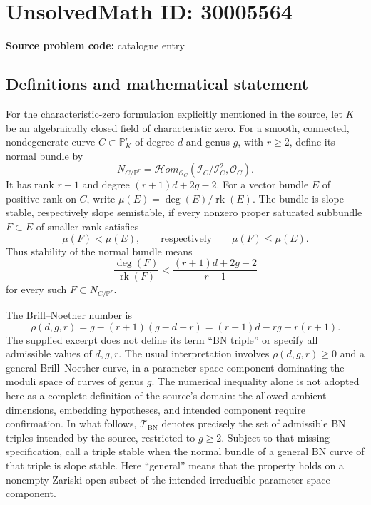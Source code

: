 \documentclass[11pt]{article}
\newcommand{\PP}{\mathbb{P}}
\begin{document}
\section*{UnsolvedMath ID: 30005564}
\textbf{Source problem code:} catalogue entry
\subsection{Definitions and mathematical statement}
For the characteristic-zero formulation explicitly mentioned in the source, let \(K\) be an algebraically closed field of characteristic zero. For a smooth, connected, nondegenerate curve \(C\subset\PP^r_K\) of degree \(d\) and genus \(g\), with \(r\geq2\), define its normal bundle by
\[
N_{C/\PP^r}=\mathcal{H}om_{\mathcal O_C}(\mathcal I_C/\mathcal I_C^2,\mathcal O_C).
\]
It has rank \(r-1\) and degree \((r+1)d+2g-2\). For a vector bundle \(E\) of positive rank on \(C\), write \(\mu(E)=\deg(E)/\operatorname{rk}(E)\). The bundle is slope stable, respectively slope semistable, if every nonzero proper saturated subbundle \(F\subset E\) of smaller rank satisfies
\[
\mu(F)<\mu(E),\qquad\text{respectively}\qquad\mu(F)\leq\mu(E).
\]
Thus stability of the normal bundle means
\[
\frac{\deg(F)}{\operatorname{rk}(F)}<\frac{(r+1)d+2g-2}{r-1}
\]
for every such \(F\subset N_{C/\PP^r}\).

The Brill--Noether number is
\[
\rho(d,g,r)=g-(r+1)(g-d+r)=(r+1)d-rg-r(r+1).
\]
The supplied excerpt does not define its term ``BN triple'' or specify all admissible values of \(d,g,r\). The usual interpretation involves \(\rho(d,g,r)\geq0\) and a general Brill--Noether curve, in a parameter-space component dominating the moduli space of curves of genus \(g\). The numerical inequality alone is not adopted here as a complete definition of the source's domain: the allowed ambient dimensions, embedding hypotheses, and intended component require confirmation. In what follows, \(\mathcal T_{\mathrm{BN}}\) denotes precisely the set of admissible BN triples intended by the source, restricted to \(g\geq2\). Subject to that missing specification, call a triple stable when the normal bundle of a general BN curve of that triple is slope stable. Here ``general'' means that the property holds on a nonempty Zariski open subset of the intended irreducible parameter-space component.
\end{document}
